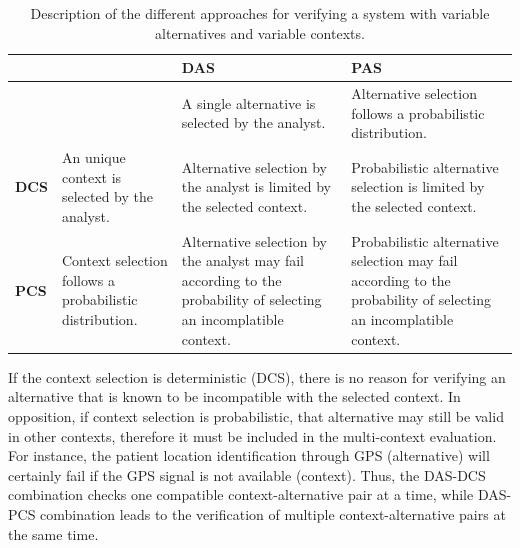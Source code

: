 \begin{table}[h]\label{tab:DAS_PAS_DCS_PCS}
{\renewcommand{\arraystretch}{1.5}
\begin{tabularx}{\textwidth}{@{}l|XXX@{}}
\toprule
             &                                                         & \textbf{DAS}                                                                                                      & \textbf{PAS}                                                                                                     \\ \midrule
             &                                                         & A single alternative is selected by the analyst.                                                                  & Alternative selection follows a probabilistic distribution.                                                      \\
\textbf{DCS} & An unique context is selected by the analyst.           & Alternative selection by the analyst is limited by the selected context.                                          & Probabilistic alternative selection is limited by the selected context.                                          \\
\textbf{PCS} & Context selection follows a probabilistic distribution. & Alternative selection by the analyst may fail according to the probability of selecting an incomplatible context. & Probabilistic alternative selection may fail according to the probability of selecting an incomplatible context. \\ \bottomrule
\end{tabularx}
}
\caption{Description of the different approaches for verifying a system with variable alternatives and variable contexts.}
\end{table}

If the context selection is deterministic (DCS), there is no reason for verifying an alternative that is known to be incompatible with the selected context. In opposition, if context selection is probabilistic, that alternative may still be valid in other contexts, therefore it must be included in the multi-context evaluation. For instance, the patient location identification through GPS (alternative) will certainly fail if the GPS signal is not available (context). Thus, the DAS-DCS combination checks one compatible context-alternative pair at a time, while DAS-PCS combination leads to the verification of multiple context-alternative pairs at the same time.

